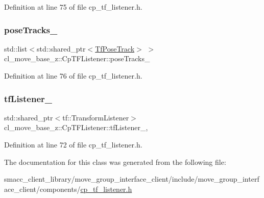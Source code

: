 Definition at line 75 of file cp\+\_\+tf\+\_\+listener.\+h.

\mbox{\label{classcl__move__base__z_1_1CpTFListener_a22555065516af0d20ea11d72dc4daa9b}} 
\subsubsection{\texorpdfstring{pose\+Tracks\+\_\+}{poseTracks\_}}
{\footnotesize\ttfamily std\+::list$<$std\+::shared\+\_\+ptr$<$\hyperlink{structcl__move__base__z_1_1TfPoseTrack}{Tf\+Pose\+Track}$>$ $>$ cl\+\_\+move\+\_\+base\+\_\+z\+::\+Cp\+T\+F\+Listener\+::pose\+Tracks\+\_\+\hspace{0.3cm}{\ttfamily [private]}}



Definition at line 76 of file cp\+\_\+tf\+\_\+listener.\+h.

\mbox{\label{classcl__move__base__z_1_1CpTFListener_a9a01782f5bd1ef2751b8044b2b5b3285}} 
\subsubsection{\texorpdfstring{tf\+Listener\+\_\+}{tfListener\_}}
{\footnotesize\ttfamily std\+::shared\+\_\+ptr$<$tf\+::\+Transform\+Listener$>$ cl\+\_\+move\+\_\+base\+\_\+z\+::\+Cp\+T\+F\+Listener\+::tf\+Listener\+\_\+\hspace{0.3cm}{\ttfamily [static]}, {\ttfamily [private]}}



Definition at line 72 of file cp\+\_\+tf\+\_\+listener.\+h.



The documentation for this class was generated from the following file\+:\begin{DoxyCompactItemize}
\item 
smacc\+\_\+client\+\_\+library/move\+\_\+group\+\_\+interface\+\_\+client/include/move\+\_\+group\+\_\+interface\+\_\+client/components/\hyperlink{cp__tf__listener_8h}{cp\+\_\+tf\+\_\+listener.\+h}\end{DoxyCompactItemize}
